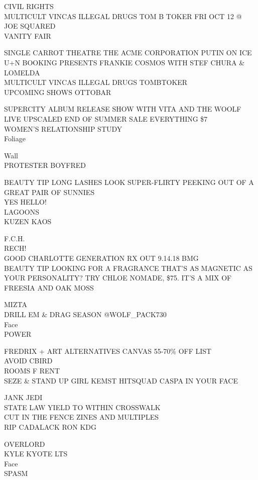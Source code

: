 \documentclass[10pt,letterpaper]{article}
\begin{document}
CIVIL RIGHTS\\
MULTICULT VINCAS ILLEGAL DRUGS TOM B TOKER FRI OCT 12 @ JOE SQUARED\\
VANITY FAIR

SINGLE CARROT THEATRE THE ACME CORPORATION PUTIN ON ICE\\
U+N BOOKING PRESENTS FRANKIE COSMOS WITH STEF CHURA \& LOMELDA\\
MULTICULT VINCAS ILLEGAL DRUGS TOMBTOKER\\
UPCOMING SHOWS OTTOBAR

SUPERCITY ALBUM RELEASE SHOW WITH VITA AND THE WOOLF\\
LIVE UPSCALED END OF SUMMER SALE EVERYTHING \$7\\
WOMEN'S RELATIONSHIP STUDY\\
Foliage

Wall\\
PROTESTER BOYFRED

BEAUTY TIP LONG LASHES LOOK SUPER{-}FLIRTY PEEKING OUT OF A GREAT PAIR OF SUNNIES\\
YES HELLO!\\
LAGOONS\\
KUZEN KAOS

F.C.H.\\
RECH!\\
GOOD CHARLOTTE GENERATION RX OUT 9.14.18 BMG\\
BEAUTY TIP LOOKING FOR A FRAGRANCE THAT'S AS MAGNETIC AS YOUR PERSONALITY?  TRY CHLOE NOMADE, \$75.  IT'S A MIX OF FREESIA AND OAK MOSS

MIZTA\\
DRILL EM \& DRAG SEASON @WOLF\_PACK730\\
Face\\
POWER

FREDRIX + ART ALTERNATIVES CANVAS 55{-}70\% OFF LIST\\
AVOID CBIRD\\
ROOMS F RENT\\
SEZE \& STAND UP GIRL KEMST HITSQUAD CASPA IN YOUR FACE

JANK JEDI\\
STATE LAW YIELD TO WITHIN CROSSWALK\\
CUT IN THE FENCE ZINES AND MULTIPLES\\
RIP CADALACK RON KDG

OVERLORD\\
KYLE KYOTE LTS\\
Face\\
SPASM
\end{document}
